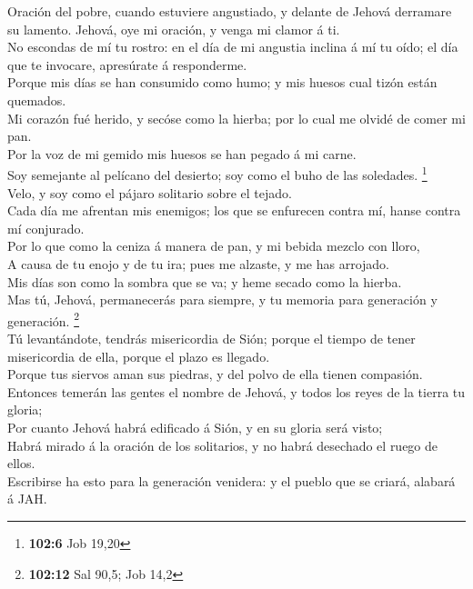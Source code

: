  Oración del pobre, cuando estuviere angustiado, y delante
de Jehová derramare su lamento. Jehová, oye mi oración, y venga mi
clamor á ti.\\
 No escondas de mí tu rostro: en el día de mi angustia
inclina á mí tu oído; el día que te invocare, apresúrate á
responderme.\\
 Porque mis días se han consumido como humo; y mis huesos
cual tizón están quemados.\\
 Mi corazón fué herido, y secóse como la hierba; por lo
cual me olvidé de comer mi pan.\\
 Por la voz de mi gemido mis huesos se han pegado á mi
carne.\\
 Soy semejante al pelícano del desierto; soy como el buho
de las soledades. \footnote{\textbf{102:6} Job 19,20}\\
 Velo, y soy como el pájaro solitario sobre el tejado.\\
 Cada día me afrentan mis enemigos; los que se enfurecen
contra mí, hanse contra mí conjurado.\\
 Por lo que como la ceniza á manera de pan, y mi bebida
mezclo con lloro,\\
 A causa de tu enojo y de tu ira; pues me alzaste, y me
has arrojado.\\
 Mis días son como la sombra que se va; y heme secado
como la hierba.\\
 Mas tú, Jehová, permanecerás para siempre, y tu memoria
para generación y generación. \footnote{\textbf{102:12} Sal 90,5; Job
  14,2}\\
 Tú levantándote, tendrás misericordia de Sión; porque el
tiempo de tener misericordia de ella, porque el plazo es llegado.\\
 Porque tus siervos aman sus piedras, y del polvo de ella
tienen compasión.\\
 Entonces temerán las gentes el nombre de Jehová, y todos
los reyes de la tierra tu gloria;\\
 Por cuanto Jehová habrá edificado á Sión, y en su gloria
será visto;\\
 Habrá mirado á la oración de los solitarios, y no habrá
desechado el ruego de ellos.\\
 Escribirse ha esto para la generación venidera: y el
pueblo que se criará, alabará á JAH.\\
